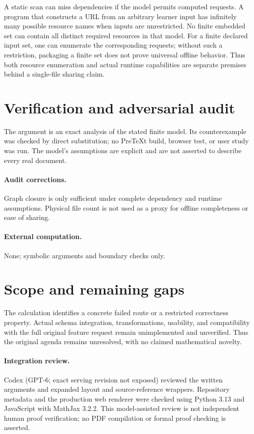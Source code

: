\documentclass[11pt]{article}
\begin{document}
A static scan can miss dependencies if the model permits computed requests. A program that constructs a URL from an arbitrary learner input has infinitely many possible resource names when inputs are unrestricted. No finite embedded set can contain all distinct required resources in that model. For a finite declared input set, one can enumerate the corresponding requests; without such a restriction, packaging a finite set does not prove universal offline behavior. Thus both resource enumeration and actual runtime capabilities are separate premises behind a single-file sharing claim.
\section{Verification and adversarial audit}
The argument is an exact analysis of the stated finite model. Its counterexample was checked by direct substitution; no PreTeXt build, browser test, or user study was run. The model's assumptions are explicit and are not asserted to describe every real document.
\paragraph{Audit corrections.} Graph closure is only sufficient under complete dependency and runtime assumptions. Physical file count is not used as a proxy for offline completeness or ease of sharing.
\paragraph{External computation.} None; symbolic arguments and boundary checks only.
\section{Scope and remaining gaps}
The calculation identifies a concrete failed route or a restricted correctness property. Actual schema integration, transformations, usability, and compatibility with the full original feature request remain unimplemented and unverified. Thus the original agenda remains unresolved, with no claimed mathematical novelty.
\paragraph{Integration review.} Codex (GPT-6; exact serving revision not exposed) reviewed the written arguments and expanded layout and source-reference wrappers. Repository metadata and the production web renderer were checked using Python 3.13 and JavaScript with MathJax 3.2.2. This model-assisted review is not independent human proof verification; no PDF compilation or formal proof checking is asserted.
\end{document}
